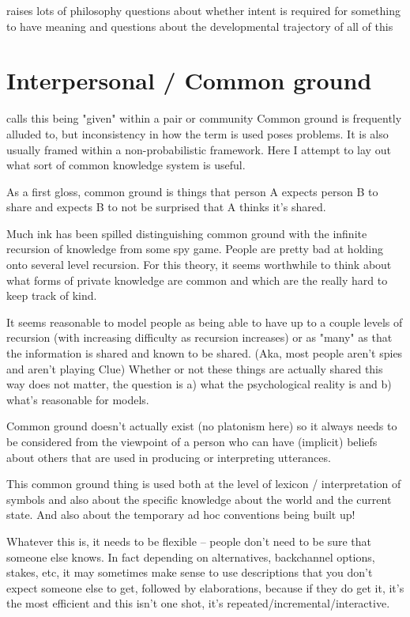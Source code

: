 \documentclass[]{article}
\begin{document}
raises lots of philosophy questions about whether intent is required for something to have meaning and questions about the developmental trajectory of all of this 


\section{Interpersonal / Common ground}

\cite{fay2010} calls this being "given" within a pair or community 
Common ground is frequently alluded to, but inconsistency in how the term is used poses problems. It is also usually framed within a non-probabilistic framework. Here I attempt to lay out what sort of common knowledge system is useful. 

As a first gloss, common ground is things that person A expects person B to share and expects B to not be surprised that A thinks it's shared. 

Much ink has been spilled distinguishing common ground with the infinite recursion of knowledge from some spy game. People are pretty bad at holding onto several level recursion. For this theory, it seems worthwhile to think about what forms of private knowledge are common and which are the really hard to keep track of kind. 

It seems reasonable to model people as being able to have up to a couple levels of recursion (with increasing difficulty as recursion increases) or as "many" as that the information is shared and known to be shared. (Aka, most people aren't spies and aren't playing Clue) Whether or not these things are actually shared this way does not matter, the question is a) what the psychological reality is and b) what's reasonable for models. 

Common ground doesn't actually exist (no platonism here) so it always needs to be considered from the viewpoint of a person who can have (implicit) beliefs about others that are used in producing or interpreting utterances. 

This common ground thing is used both at the level of lexicon / interpretation of symbols and also about the specific knowledge about the world and the current state. And also about the temporary ad hoc conventions being built up! 

Whatever this is, it needs to be flexible -- people don't need to be sure that someone else knows. In fact depending on alternatives, backchannel options, stakes, etc, it may sometimes make sense to use descriptions that you don't expect someone else to get, followed by elaborations, because if they do get it, it's the most efficient and this isn't one shot, it's repeated/incremental/interactive. 
\end{document}
